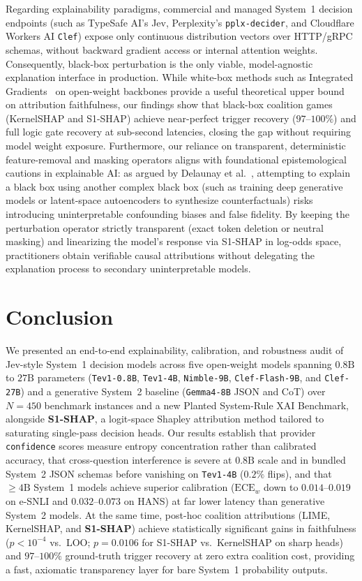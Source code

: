 \documentclass[10pt]{article}
\begin{document}
Regarding explainability paradigms, commercial and managed System~1 decision endpoints (such as TypeSafe AI's Jev, Perplexity's \texttt{pplx-decider}, and Cloudflare Workers AI \texttt{Clef}) expose only continuous distribution vectors over HTTP/gRPC schemas, without backward gradient access or internal attention weights.
Consequently, black-box perturbation is the only viable, model-agnostic explanation interface in production.
While white-box methods such as Integrated Gradients~\cite{sundararajan2017} on open-weight backbones provide a useful theoretical upper bound on attribution faithfulness, our findings show that black-box coalition games (KernelSHAP and S1-SHAP) achieve near-perfect trigger recovery ($97$--$100\%$) and full logic gate recovery at sub-second latencies, closing the gap without requiring model weight exposure.
Furthermore, our reliance on transparent, deterministic feature-removal and masking operators aligns with foundational epistemological cautions in explainable AI: as argued by Delaunay et al.~\cite{delaunay2024blackbox}, attempting to explain a black box using another complex black box (such as training deep generative models or latent-space autoencoders to synthesize counterfactuals) risks introducing uninterpretable confounding biases and false fidelity.
By keeping the perturbation operator strictly transparent (exact token deletion or neutral masking) and linearizing the model's response via S1-SHAP in log-odds space, practitioners obtain verifiable causal attributions without delegating the explanation process to secondary uninterpretable models.

\section{Conclusion}
We presented an end-to-end explainability, calibration, and robustness audit of Jev-style System~1 decision models across five open-weight models spanning $0.8\text{B}$ to $27\text{B}$ parameters (\texttt{Tev1-0.8B}, \texttt{Tev1-4B}, \texttt{Nimble-9B}, \texttt{Clef-Flash-9B}, and \texttt{Clef-27B}) and a generative System~2 baseline (\texttt{Gemma4-8B} JSON and CoT) over $N=450$ benchmark instances and a new Planted System-Rule XAI Benchmark, alongside \textbf{S1-SHAP}, a logit-space Shapley attribution method tailored to saturating single-pass decision heads.
Our results establish that provider \texttt{confidence} scores measure entropy concentration rather than calibrated accuracy, that cross-question interference is severe at $0.8\text{B}$ scale and in bundled System~2 JSON schemas before vanishing on \texttt{Tev1-4B} ($0.2\%$ flips), and that $\ge 4\text{B}$ System~1 models achieve superior calibration ($\text{ECE}_w$ down to $0.014$--$0.019$ on e-SNLI and $0.032$--$0.073$ on HANS) at far lower latency than generative System~2 models.
At the same time, post-hoc coalition attributions (LIME, KernelSHAP, and \textbf{S1-SHAP}) achieve statistically significant gains in faithfulness ($p < 10^{-4}$ vs.\ LOO; $p = 0.0106$ for S1-SHAP vs.\ KernelSHAP on sharp heads) and $97$--$100\%$ ground-truth trigger recovery at zero extra coalition cost, providing a fast, axiomatic transparency layer for bare System~1 probability outputs.
\end{document}
